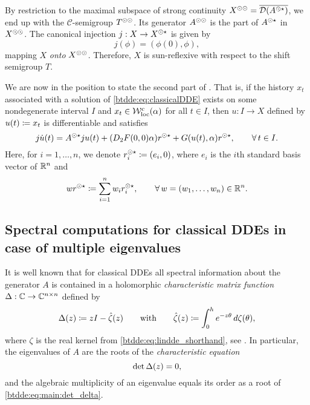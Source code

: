 By restriction to the maximal subspace of strong continuity $X^{\odot\odot} =
\overline{\mathcal{D}(A^{\odot\star})}$, we end up with the $\mathcal{C}$-semigroup
$T^{\odot\odot}$. Its generator $A^{\odot\odot}$ is the part of $A^{\odot\star}$ in
$X^{\odot\odot}$.
The canonical injection $j : X \to X^{\odot\star}$ is given by
\begin{equation}
    \label{btdde:eq:j}
    j(\phi) = \left(\phi(0), \phi \right),
\end{equation}
mapping $X$ \emph{onto} $X^{\odot\odot}$. Therefore, $X$ is sun-reflexive with
respect to the shift semigroup $T$.

We are now in the position to state the second part of \cite[Corollary 20]{Switching2019}. That is, if the history $x_t$ associated with a solution of \cref{btdde:eq:classicalDDE} exists on some nondegenerate interval $I$ and $x_t \in \mathcal{W}^c_{\text{loc}}(\alpha)$ for all $t \in I$, then $u : I \to X$ defined by $u(t) \coloneqq x_t$ is differentiable and satisfies
\[
  j\dot{u}(t) = A^{\odot\star}ju(t) + (D_2F(0,0)\alpha)r^{\odot\star} 
                    + G(u(t),\alpha)r^{\odot\star}, \qquad \forall\,t \in I.
\]
Here, for $i = 1,\ldots,n$, we denote $r^{\odot\star}_i \coloneqq (e_i, 0)$, where $e_i$ is the
$i$th standard basis vector of $\mathbb{R}^n$ and
\[
  w r^{\odot\star} \coloneqq \sum_{i=1}^n{w_ir^{\odot\star}_i}, \qquad 
    \forall\,w = (w_1,\ldots,w_n) \in \mathbb{R}^n.
\]

\subsection{Spectral computations for classical DDEs in case of multiple eigenvalues}
It is well known that for classical DDEs all spectral information about the
generator $A$ is contained in a holomorphic \emph{characteristic matrix
function} $\Delta : \mathbb{C}
\to \mathbb{C}^{n \times n}$ defined by
\begin{equation}
\label{btdde:eq:CharMatrix}
  \Delta(z) \coloneqq zI - \hat{\zeta}(z) 
  \qquad \text{with} 
  \qquad \hat{\zeta}(z) \coloneqq \int_0^h{e^{-z\theta}\,d\zeta(\theta)},
\end{equation}
where $\zeta$ is the real kernel from \cref{btdde:eq:lindde_shorthand}, see
\cite[Sections IV.4 and IV.5]{diekmann1995delay}. In particular, the
eigenvalues of $A$ are the roots of the \emph{characteristic equation}
\begin{equation}
  \label{btdde:eq:main:det_delta}
\operatorname{det}{\Delta(z)} = 0,
\end{equation}
and the algebraic multiplicity of an eigenvalue equals its order as a root of
\cref{btdde:eq:main:det_delta}.

